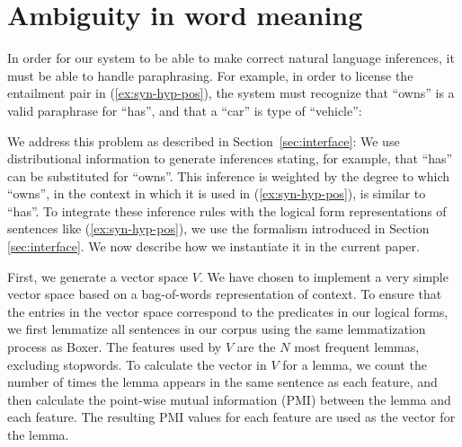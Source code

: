 \section{Ambiguity in word meaning}

In order for our system to be able to make correct natural language inferences,
it must be able to handle paraphrasing.  For example, in order to license the
entailment pair in (\ref{ex:syn-hyp-pos}), the system must recognize that
``owns'' is a valid paraphrase for ``has'', and that a ``car'' is type of
``vehicle'':


We address this problem as described in Section~\ref{sec:interface}: 
We use distributional information to
generate inferences stating, for example,  that ``has'' can be substituted for
``owns''. This inference is weighted by the degree to which 
``owns'', in the context in which it is used in
(\ref{ex:syn-hyp-pos}), is similar to ``has''. To integrate these
inference rules with the logical form representations of sentences
like (\ref{ex:syn-hyp-pos}), we use the formalism introduced in
Section \ref{sec:interface}. We now describe how we instantiate it in
the current paper.



First, we generate a vector space $V$.  We have chosen to implement a very
simple vector space based on a bag-of-words representation of context.  To ensure that the entries in the vector
space correspond to the predicates in our logical forms, we first lemmatize all
sentences in our corpus using the same lemmatization process as Boxer.
The features used by $V$ are the $N$ most frequent lemmas, excluding stopwords.  
To calculate the vector in $V$ for a lemma, we count the number of times the lemma appears in the same sentence
as each feature, and then calculate the point-wise mutual information (PMI)
between the lemma and each feature.  The resulting PMI values for each feature
are used as the vector for the lemma.

